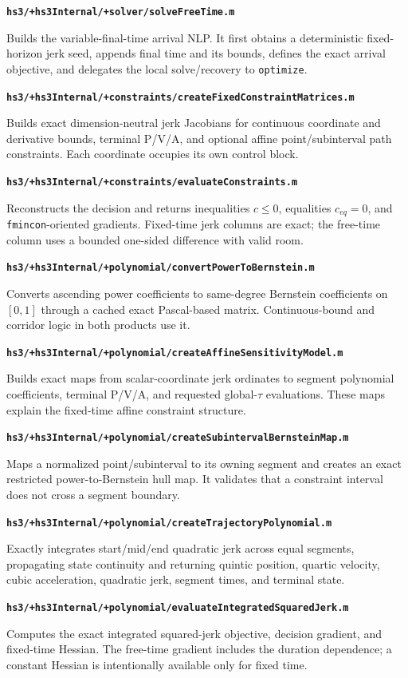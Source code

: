 \documentclass[10pt,letterpaper]{article}
\newcommand{\file}[1]{\nolinkurl{#1}}
\newcommand{\scriptentry}[2]{%
  \par\medskip\noindent\textbf{\file{#1}}\par
  \begingroup\raggedright #2\par\endgroup
}
\begin{document}
\scriptentry{hs3/+hs3Internal/+solver/solveFreeTime.m}{Builds the
variable-final-time arrival NLP. It first obtains a deterministic fixed-horizon
jerk seed, appends final time and its bounds, defines the exact arrival
objective, and delegates the local solve/recovery to \file{optimize}.}

\scriptentry{hs3/+hs3Internal/+constraints/createFixedConstraintMatrices.m}{Builds
exact dimension-neutral jerk Jacobians for continuous coordinate and derivative
bounds, terminal P/V/A, and optional affine point/subinterval path constraints.
Each coordinate occupies its own control block.}

\scriptentry{hs3/+hs3Internal/+constraints/evaluateConstraints.m}{Reconstructs
the decision and returns inequalities $c\le0$, equalities $c_{eq}=0$, and
\file{fmincon}-oriented gradients. Fixed-time jerk columns are exact; the
free-time column uses a bounded one-sided difference with valid room.}

\scriptentry{hs3/+hs3Internal/+polynomial/convertPowerToBernstein.m}{Converts
ascending power coefficients to same-degree Bernstein coefficients on
$[0,1]$ through a cached exact Pascal-based matrix. Continuous-bound and
corridor logic in both products use it.}

\scriptentry{hs3/+hs3Internal/+polynomial/createAffineSensitivityModel.m}{Builds
exact maps from scalar-coordinate jerk ordinates to segment polynomial
coefficients, terminal P/V/A, and requested global-$\tau$ evaluations. These
maps explain the fixed-time affine constraint structure.}

\scriptentry{hs3/+hs3Internal/+polynomial/createSubintervalBernsteinMap.m}{Maps a
normalized point/subinterval to its owning segment and creates an exact
restricted power-to-Bernstein hull map. It validates that a constraint interval
does not cross a segment boundary.}

\scriptentry{hs3/+hs3Internal/+polynomial/createTrajectoryPolynomial.m}{Exactly
integrates start/mid/end quadratic jerk across equal segments, propagating
state continuity and returning quintic position, quartic velocity, cubic
acceleration, quadratic jerk, segment times, and terminal state.}

\scriptentry{hs3/+hs3Internal/+polynomial/evaluateIntegratedSquaredJerk.m}{Computes
the exact integrated squared-jerk objective, decision gradient, and fixed-time
Hessian. The free-time gradient includes the duration dependence; a constant
Hessian is intentionally available only for fixed time.}
\end{document}
